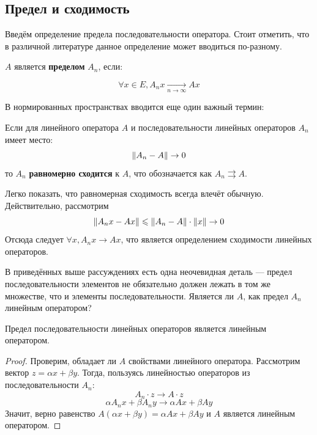 \documentclass[12pt]{article}
\begin{document}
	\subsection{Предел и сходимость}

		Введём определение предела последовательности оператора. Стоит отметить, что в различной литературе данное определение может вводиться
		по-разному.
	
		\begin{defi}
			$A$ является \textbf{пределом} $A_n$, если:
		
			$$\forall x \in E, A_n x \underset{n \rightarrow \infty}{\rightarrow} A x$$
		\end{defi}
		В нормированных пространствах вводится еще один 
		важный термин:
	
		\begin{defi}
			Если для линейного оператора $A$ и последовательности линейных операторов $A_n$ имеет место:
			$$\left\| A_n - A \right\| \rightarrow 0$$
			то $A_n$ \textbf{равномерно сходится} к $A$, что обозначается как $A_n \rightrightarrows A$.
		\end{defi}
	
		Легко показать, что равномерная сходимость всегда влечёт обычную. Действительно, рассмотрим
		$$\left\| A_n x - A x \right\| \leqslant \left\| A_n - A \right\| \cdot \left\| x \right\| \rightarrow 0$$
		Отсюда следует $\forall x, A_n x \rightarrow A x$, что является определением сходимости линейных операторов.
	
		В приведённых выше рассуждениях есть одна неочевидная деталь --- предел последовательности элементов не обязательно должен лежать
		в том же множестве, что и элементы последовательности. Является ли $A$, как предел $A_n$ линейным оператором?
	
		\begin{state}
			Предел последовательности линейных операторов является линейным оператором.
		\end{state}
		\begin{proof}
			Проверим, обладает ли $A$ свойствами линейного оператора. Рассмотрим вектор $z = \alpha x + \beta y$. 
			Тогда, пользуясь линейностью операторов из последовательности $A_n$:
			$$ A_n \cdot z \rightarrow A \cdot z $$
			$$ \alpha A_n x + \beta A_n y \rightarrow \alpha A x + \beta A y $$
			Значит, верно равенство $A(\alpha x + \beta y) = \alpha A x + \beta A y$ и $A$ является линейным оператором.
		\end{proof}
	
\end{document}
